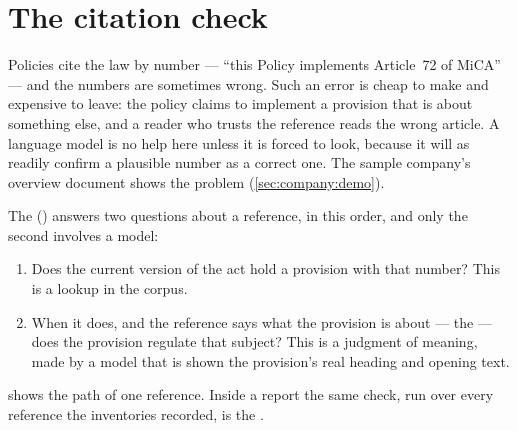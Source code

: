 \section{The citation check}\label{sec:company:check}

Policies cite the law by number --- \enquote{this Policy implements Article~72 of MiCA} ---
and the numbers are sometimes wrong. Such an error is cheap
to make and expensive to leave: the policy claims to implement a provision that is about
something else, and a reader who trusts the reference reads the wrong article. A language
model is no help here unless it is forced to look, because it will as readily confirm a
plausible number as a correct one. The sample company's overview document shows the problem
(\cref{sec:company:demo}).

The  () answers two questions about a
reference, in this order, and only the second involves a model:

\begin{enumerate}
  \item Does the current version of the act hold a provision with that number? This is a
    lookup in the corpus.
  \item When it does, and the reference says what the provision is about --- the
     --- does the provision regulate that subject? This is a judgment of meaning,
    made by a model that is shown the provision's real heading and opening text.
\end{enumerate}

 shows the path of one reference. Inside a report the same check, run
over every reference the inventories recorded, is the .

